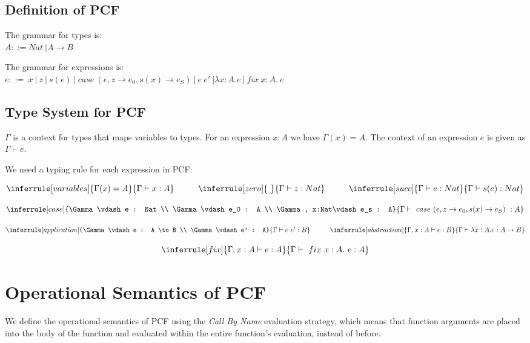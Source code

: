 \section{Definition of PCF}
The grammar for types is:\\
$A ::= Nat \ | A \to B$ 

The grammar for expressions is:\\
$e ::=  \ x \ | \ z \ | \ s(e) \  |  \ case \ (e, z \to e_0 , s(x) \to e_S) \ |\ e \ e' \  | \lambda x:A.e \ | \ fix \ x:A . \ e$ \\

\section{Type System for PCF}
$\Gamma$ is a context for types that maps variables to types. For an expression $x : A$ we have $\Gamma(x) = A$. The context of an expression $e$ is given as $\Gamma \vdash e$.


 We need a typing rule for each expression in PCF:


$$
\inferrule [variables]{ \Gamma(x) = A }
 {\Gamma \vdash x : A}
\hspace{1cm}
\inferrule [zero]{ \ }
 {\Gamma \vdash z : Nat}
\hspace{1cm}
\inferrule [succ]{ \Gamma \vdash e : Nat }
 {\Gamma \vdash s(e) : Nat}
$$

$$
\inferrule [case]{\Gamma \vdash e : Nat \\  \Gamma \vdash e_0 : A \\  \Gamma , x:Nat\vdash e_s : A}
  {\Gamma \vdash \ case \ (e, z \to e_0 , s(x) \to e_S) \  : A}  
$$

$$
\inferrule [application]{\Gamma \vdash e : A \to B \\  \Gamma \vdash e' : A}
  {\Gamma \vdash e \ e' : B}
  \hspace{1cm}
\inferrule [abstraction] {\Gamma , x : A \vdash  e : B}
  {\Gamma \vdash \lambda x : A. e : A \to B}  
$$

$$
\inferrule [fix]{\Gamma, x : A \vdash e : A }
  {\Gamma \vdash \  fix \ x:A . \ e : A}
$$

\chapter{Operational Semantics of PCF}
We define the operational semantics of PCF using the \emph{Call By Name} evaluation strategy, which means that function arguments are placed into the body of the function and evaluated within the entire function's evaluation, instead of before.


